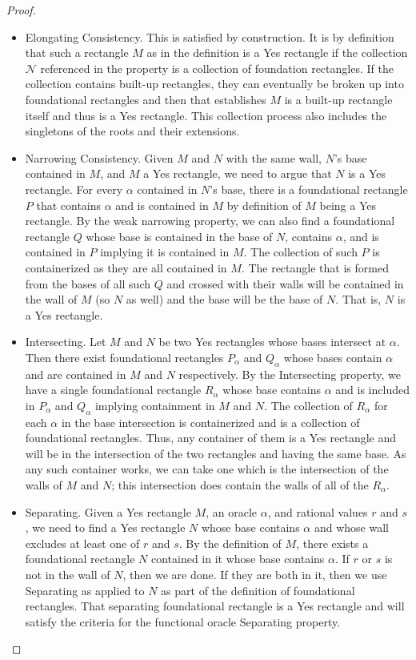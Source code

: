 \documentclass[12pt]{article}
\begin{document}
\begin{proof}
    \begin{itemize}
        \item Elongating Consistency. This is satisfied by construction. It is by definition that such a rectangle $M$ as in the definition is a Yes rectangle if the collection $\mathcal{N}$ referenced in the property is a collection of foundation rectangles. If the collection contains built-up rectangles, they can eventually be broken up into foundational rectangles and then that establishes $M$ is a built-up rectangle itself and thus is a Yes rectangle. This collection process also includes the singletons of the roots and their extensions. 
        \item Narrowing Consistency. Given $M$ and $N$ with the same wall, $N$'s base contained in $M$, and $M$ a Yes rectangle, we need to argue that $N$ is a Yes rectangle. For every $\alpha$ contained in $N$'s base, there is a foundational rectangle $P$ that contains $\alpha$ and is contained in $M$ by definition of $M$ being a Yes rectangle. By the weak narrowing property, we can also find a foundational rectangle $Q$ whose base is contained in the base of $N$, contains $\alpha$, and is contained in $P$ implying it is contained in $M$. The collection of such $P$ is containerized as they are all contained in $M$.  The rectangle that is formed from the bases of all such $Q$ and crossed with their walls will be contained in the wall of $M$ (so $N$ as well) and the base will be the base of $N$. That is, $N$ is a Yes rectangle.  
        \item Intersecting. Let $M$ and $N$ be two Yes rectangles whose bases intersect at $\alpha$. Then there exist foundational rectangles $P_{\alpha}$ and $Q_{\alpha}$ whose bases contain $\alpha$ and are contained in $M$ and $N$ respectively. By the Intersecting property, we have a single foundational rectangle $R_{\alpha}$ whose base contains $\alpha$ and is included in $P_{\alpha}$ and $Q_{\alpha}$ implying containment in $M$ and $N$. The collection of $R_{\alpha}$ for each $\alpha$ in the base intersection is containerized and is a collection of foundational rectangles. Thus, any container of them is a Yes rectangle and will be in the intersection of the two rectangles and having the same base. As any such container works, we can take one which is the intersection of the walls of $M$ and $N$; this intersection does contain the walls of all of the $R_{\alpha}$.
        \item Separating. Given a Yes rectangle $M$,  an oracle $\alpha$, and rational values $r$ and $s$, we need to find a Yes rectangle $N$ whose base contains $\alpha$ and whose wall excludes at least one of $r$ and $s$. By the definition of $M$, there exists a foundational rectangle $N$ contained in it whose base contains $\alpha$. If $r$ or $s$ is not in the wall of $N$, then we are done. If they are both in it, then we use Separating as applied to $N$ as part of the definition of foundational rectangles. That separating foundational rectangle is a Yes rectangle and will satisfy the criteria for the functional oracle Separating property. 

\end{itemize}
\end{proof}
\end{document}
